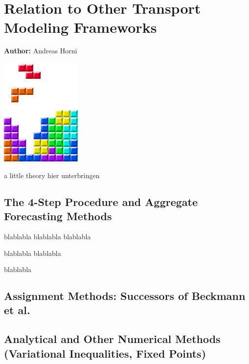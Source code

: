 \chapter{Relation to Other Transport Modeling Frameworks}
\label{ch:toolsspectrum}

\hfill \textbf{Author:} Andreas Horni

\begin{center} \includegraphics[width=0.3\textwidth, angle=0]{figures/MATSimBook.png} \end{center}

a little theory hier unterbringen



\section{The 4-Step Procedure and Aggregate Forecasting Methods}
blablabla blablabla blablabla

blablabla blablabla

blablabla

\section{Assignment Methods: Successors of Beckmann et al.}

\section{Analytical and Other Numerical Methods (Variational Inequalities, Fixed Points)}

